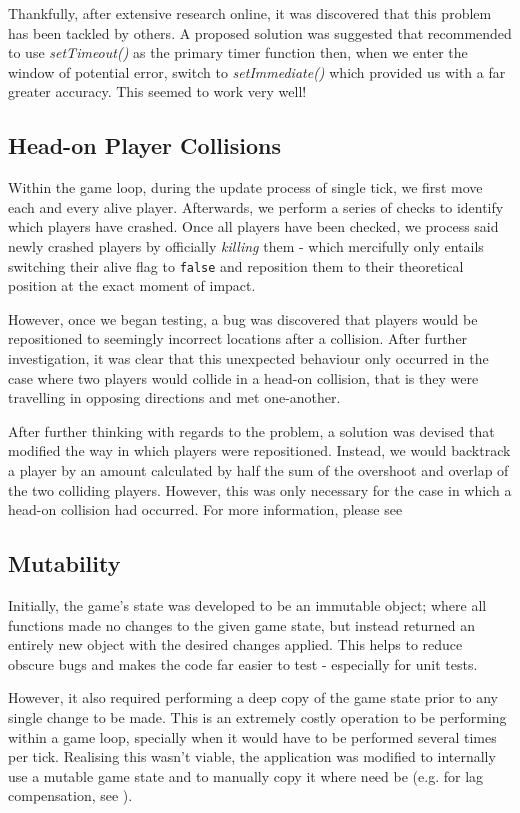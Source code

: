 \documentclass{standalone}
\begin{document}
			Thankfully, after extensive research online, it was discovered that this problem has been tackled by others. A proposed solution\parencite{JsGameLoop} was suggested that recommended to use \emph{setTimeout()} as the primary timer function then, when we enter the window of potential error, switch to \emph{setImmediate()} which provided us with a far greater accuracy. This seemed to work very well!

		\subsection{Head-on Player Collisions}
			Within the game loop, during the update process of single tick, we first move each and every alive player. Afterwards, we perform a series of checks to identify which players have crashed. Once all players have been checked, we process said newly crashed players by officially \emph{killing} them - which mercifully only entails switching their alive flag to \texttt{false} and reposition them to their theoretical position at the exact moment of impact.

			However, once we began testing, a bug was discovered that players would be repositioned to seemingly incorrect locations after a collision. After further investigation, it was clear that this unexpected behaviour only occurred in the case where two players would collide in a head-on collision, that is they were travelling in opposing directions and met one-another.

			After further thinking with regards to the problem, a solution was devised that modified the way in which players were repositioned. Instead, we would backtrack a player by an amount calculated by half the sum of the overshoot and overlap of the two colliding players. However, this was only necessary for the case in which a head-on collision had occurred. For more information, please see 

		\subsection{Mutability}
			Initially, the game's state was developed to be an immutable object; where all functions made no changes to the given game state, but instead returned an entirely new object with the desired changes applied. This helps to reduce obscure bugs and makes the code far easier to test - especially for unit tests.

			However, it also required performing a deep copy of the game state prior to any single change to be made. This is an extremely costly operation to be performing within a game loop, specially when it would have to be performed several times per tick. Realising this wasn't viable, the application was modified to internally use a mutable game state and to manually copy it where need be (e.g. for lag compensation, see ).
\end{document}
